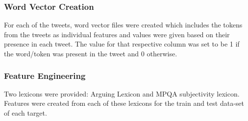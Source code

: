 \documentclass[9pt,twocolumn,twoside]{../../styles/osajnl}
\begin{document}
\subsubsection{Word Vector Creation}
For each of the tweets, word vector files were created which includes the tokens from the tweets as individual features and values were given based on their presence in each tweet. The value for that respective column was set to be 1 if the word/token was present in the tweet and 0 otherwise.
\subsubsection{Feature Engineering }
Two lexicons were provided: Arguing Lexicon and MPQA subjectivity lexicon. Features were created from each of these lexicons for the train and test data-set of each target. 
\end{document}
